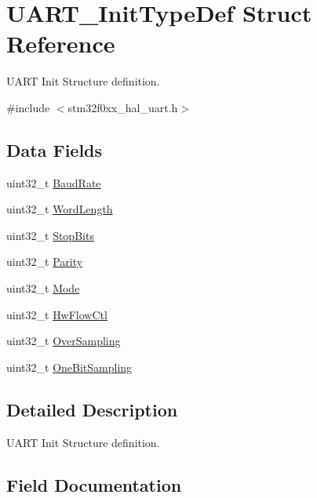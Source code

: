 \hypertarget{struct_u_a_r_t___init_type_def}{}\section{U\+A\+R\+T\+\_\+\+Init\+Type\+Def Struct Reference}
\label{struct_u_a_r_t___init_type_def}


U\+A\+RT Init Structure definition.  




{\ttfamily \#include $<$stm32f0xx\+\_\+hal\+\_\+uart.\+h$>$}

\subsection*{Data Fields}
\begin{DoxyCompactItemize}
\item 
uint32\+\_\+t \hyperlink{struct_u_a_r_t___init_type_def_aaad609733f3fd8146c8745e953a91b2a}{Baud\+Rate}
\item 
uint32\+\_\+t \hyperlink{struct_u_a_r_t___init_type_def_ae5e60b9a021fe0009588fc86c7584a5a}{Word\+Length}
\item 
uint32\+\_\+t \hyperlink{struct_u_a_r_t___init_type_def_a8394ba239444e3e5fe1ada1c37cb1019}{Stop\+Bits}
\item 
uint32\+\_\+t \hyperlink{struct_u_a_r_t___init_type_def_a1d60a99b8f3965f01ab23444b154ba79}{Parity}
\item 
uint32\+\_\+t \hyperlink{struct_u_a_r_t___init_type_def_a0ffc93ec511ed9cf1663f6939bd3e839}{Mode}
\item 
uint32\+\_\+t \hyperlink{struct_u_a_r_t___init_type_def_a0a933d213b17470c582c8fec23a24d09}{Hw\+Flow\+Ctl}
\item 
uint32\+\_\+t \hyperlink{struct_u_a_r_t___init_type_def_a35770b237370fda7fd0fabad22898490}{Over\+Sampling}
\item 
uint32\+\_\+t \hyperlink{struct_u_a_r_t___init_type_def_af699e096fa74b5f58c1ee172025981ba}{One\+Bit\+Sampling}
\end{DoxyCompactItemize}


\subsection{Detailed Description}
U\+A\+RT Init Structure definition. 

\subsection{Field Documentation}
\mbox{\label{struct_u_a_r_t___init_type_def_aaad609733f3fd8146c8745e953a91b2a}} 

